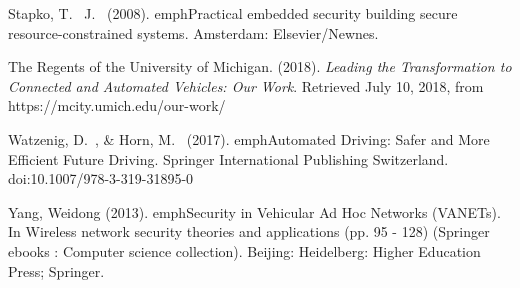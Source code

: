 \documentclass[conference,compsoc]{IEEEtran}
\begin{document}
\begin{thebibliography}{1}
Stapko, T.~ J.~ (2008). emph{Practical embedded security building secure resource-constrained systems}. Amsterdam: Elsevier/Newnes.

The Regents of the University of Michigan. (2018). \emph{Leading the Transformation to Connected and Automated Vehicles: Our Work}. Retrieved July 10, 2018, from https://mcity.umich.edu/our-work/

Watzenig, D.~, \& Horn, M.~ (2017). emph{Automated Driving: Safer and More Efficient Future Driving}. Springer International Publishing Switzerland. doi:10.1007/978-3-319-31895-0

Yang, Weidong (2013). emph{Security in Vehicular Ad Hoc Networks (VANETs)}. In Wireless network security theories and applications (pp. 95 - 128)  (Springer ebooks : Computer science collection). Beijing: Heidelberg: Higher Education Press; Springer.

\end{thebibliography}
\end{document}
